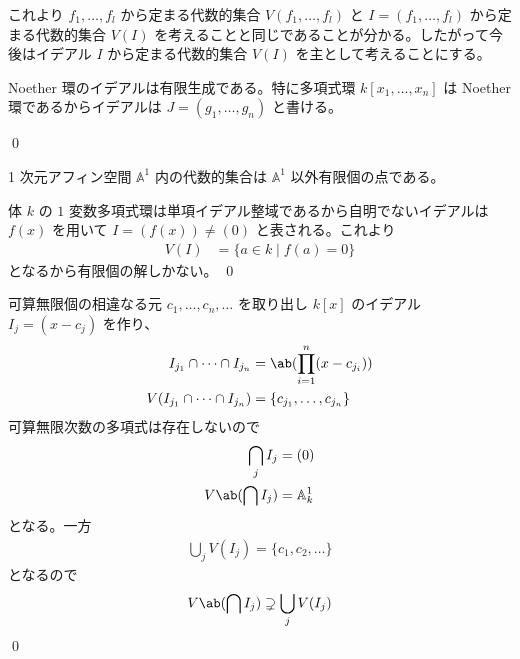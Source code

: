 \documentclass[uplatex,dvipdfmx,a4paper,11pt]{jlreq}
\makeatletter
\renewcommand{\AA}{\mathbb{A}}
\numberwithin{equation}{section}
\theoremstyle{definition}
\renewenvironment{proof}[1][\proofname]{\par
  \normalfont
  \topsep6\p@\@plus6\p@ \trivlist
  \item[\hskip\labelsep{\bfseries #1}\@addpunct{\bfseries}]\ignorespaces\quad\par
}{%
  \qed\endtrivlist\@endpefalse
}
\renewcommand\proofname{証明}
\makeatother
\begin{document}
これより $f_1,\ldots,f_l$ から定まる代数的集合 $V(f_1,\ldots,f_l)$ と $I = (f_1,\ldots,f_l)$ から定まる代数的集合 $V(I)$ を考えることと同じであることが分かる。したがって今後はイデアル $I$ から定まる代数的集合 $V(I)$ を主として考えることにする。

\begin{theorem}
  Noether 環のイデアルは有限生成である。特に多項式環 $k[x_1,\ldots,x_n]$ は Noether 環であるからイデアルは $J = (g_1,\ldots,g_n)$ と書ける。
\end{theorem}
\begin{proof}

\end{proof}

\begin{proposition}
  1 次元アフィン空間 $\AA^1$ 内の代数的集合は $\AA^1$ 以外有限個の点である。
\end{proposition}
\begin{proof}
  体 $k$ の $1$ 変数多項式環は単項イデアル整域であるから自明でないイデアルは $f(x)$ を用いて $I = (f(x)) \neq (0)$ と表される。これより
  \begin{align}
    V(I) & = \lbrace a\in k\mid f(a) = 0\rbrace
  \end{align}
  となるから有限個の解しかない。
\end{proof}

\begin{proposition}

\end{proposition}
\begin{proof}
  可算無限個の相違なる元 $c_1,\ldots,c_n,\ldots$ を取り出し $k[x]$ のイデアル $I_j = (x - c_j)$ を作り、
  \begin{align}
    I_{j_1}\cap \cdots\cap I_{j_n}    & = \ab(\prod_{i=1}^{n}(x - c_{j_i}))      \\
    V(I_{j_1}\cap \cdots\cap I_{j_n}) & = \lbrace c_{j_1},\ldots,c_{j_n} \rbrace
  \end{align}
  可算無限次数の多項式は存在しないので
  \begin{align}
    \bigcap_j I_j     & = (0)     \\
    V\ab(\bigcap I_j) & = \AA_k^1
  \end{align}
  となる。一方
  \begin{align}
    \bigcup_j V(I_j) = \lbrace c_1, c_2, \ldots \rbrace
  \end{align}
  となるので
  \begin{align}
    V\ab(\bigcap I_j) \supsetneq \bigcup_j V(I_j)
  \end{align}
\end{proof}
\end{document}
